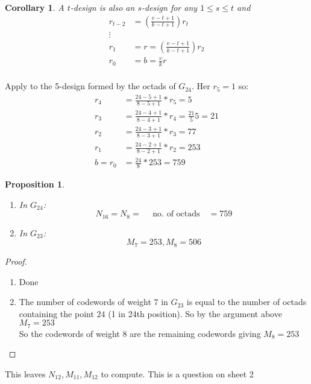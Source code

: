 \documentclass[]{article}
\newtheorem*{cor}{Corollary}
\newtheorem{prop}[thm]{Proposition}
\theoremstyle{definition}
\theoremstyle{remark}
\numberwithin{equation}{section}
\begin{document}
		\begin{cor} A $t$-design is also an $s$-design for any $1\leq s \leq t$ and
			\begin{align*}
				r_{t-2} &= \left(\frac{v-t+1}{k-t+1}\right) r_t \\
				\vdots\\
				r_{1} &= r = \left(\frac{v-t+1}{k-t+1}\right) r_2\\
				r_{0} &= b = \frac{v}{k}r\\
			\end{align*}
		\end{cor}

		Apply to the 5-design formed by the octads of $G_{24}$. Her $r_5 = 1$ so:
		\begin{align*}
			r_4 &= \frac{24 - 5 + 1}{8 -5 +1 }* r_5 = 5\\
			r_3 &= \frac{24 - 4 + 1}{8 -4 +1 }* r_4 = \frac{21}{5} 5 = 21\\
			r_2 &= \frac{24 - 3 + 1}{8 -3 +1 }* r_3 = 77\\
			r_1 &= \frac{24 - 2 + 1}{8 -2 +1 }* r_2 = 253\\
			b = r_0 &= \frac{24}{8} * 253 = 759
		\end{align*}

		\begin{prop}\hfill
			\begin{enumerate}
				\item In $G_{24}$:
				\[
					N_{16} = N_{8} =\quad \text{ no. of octads}\quad = 759
				\]
				\item In $G_{23}$:
				\[
					M_{7} = 253, M_{8} = 506
				\]
			\end{enumerate}
		\end{prop}

		\begin{proof}\hfill
			\begin{enumerate}
				\item Done\\
				\item The number of codewords of weight $7$ in $G_{23}$ is equal to the number of octads containing the point $24$ (1 in 24th position). So by the argument above $M_7 = 253$\\

				So the codewords of weight $8$ are the remaining codewords giving $M_8 = 253$
			\end{enumerate}
		\end{proof}

		This leaves $N_{12}, M_{11}, M_{12}$ to compute. This is a question on sheet 2
\end{document}
